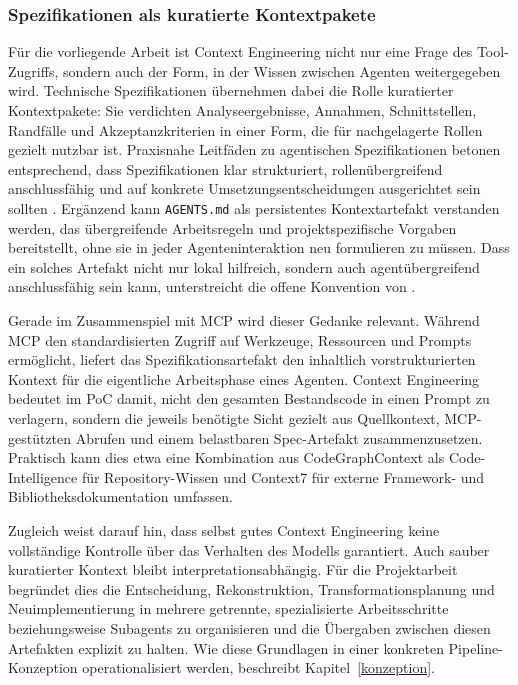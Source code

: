 \subsubsection{Spezifikationen als kuratierte Kontextpakete}

Für die vorliegende Arbeit ist Context Engineering nicht nur eine Frage des Tool-Zugriffs, sondern auch der Form, in der Wissen zwischen Agenten weitergegeben wird. Technische Spezifikationen übernehmen dabei die Rolle kuratierter Kontextpakete: Sie verdichten Analyseergebnisse, Annahmen, Schnittstellen, Randfälle und Akzeptanzkriterien in einer Form, die für nachgelagerte Rollen gezielt nutzbar ist. Praxisnahe Leitfäden zu agentischen Spezifikationen betonen entsprechend, dass Spezifikationen klar strukturiert, rollenübergreifend anschlussfähig und auf konkrete Umsetzungsentscheidungen ausgerichtet sein sollten \parencite{githubspeckit,boeckeler2025sdd}. Ergänzend kann \texttt{AGENTS.md} als persistentes Kontextartefakt verstanden werden, das übergreifende Arbeitsregeln und projektspezifische Vorgaben bereitstellt, ohne sie in jeder Agenteninteraktion neu formulieren zu müssen. Dass ein solches Artefakt nicht nur lokal hilfreich, sondern auch agentübergreifend anschlussfähig sein kann, unterstreicht die offene Konvention von \textcite{agentsmd}.

Gerade im Zusammenspiel mit MCP wird dieser Gedanke relevant. Während MCP den standardisierten Zugriff auf Werkzeuge, Ressourcen und Prompts ermöglicht, liefert das Spezifikationsartefakt den inhaltlich vorstrukturierten Kontext für die eigentliche Arbeitsphase eines Agenten. Context Engineering bedeutet im PoC damit, nicht den gesamten Bestandscode in einen Prompt zu verlagern, sondern die jeweils benötigte Sicht gezielt aus Quellkontext, MCP-gestützten Abrufen und einem belastbaren Spec-Artefakt zusammenzusetzen. Praktisch kann dies etwa eine Kombination aus CodeGraphContext als Code-Intelligence für Repository-Wissen und Context7 für externe Framework- und Bibliotheksdokumentation umfassen.

Zugleich weist \textcite{boeckeler2026contextengineering} darauf hin, dass selbst gutes Context Engineering keine vollständige Kontrolle über das Verhalten des Modells garantiert. Auch sauber kuratierter Kontext bleibt interpretationsabhängig. Für die Projektarbeit begründet dies die Entscheidung, Rekonstruktion, Transformationsplanung und Neuimplementierung in mehrere getrennte, spezialisierte Arbeitsschritte beziehungsweise Subagents zu organisieren und die Übergaben zwischen diesen Artefakten explizit zu halten. Wie diese Grundlagen in einer konkreten Pipeline-Konzeption operationalisiert werden, beschreibt Kapitel~\ref{konzeption}.
